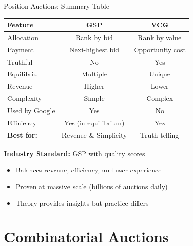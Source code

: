 \documentclass[xcolor={x11names}, aspectratio=169 ]{beamer}
\begin{document}
\begin{frame}{Position Auctions: Summary Table}
\begin{center}
\small
\begin{tabular}{lcc}
\toprule
\textbf{Feature} & \textbf{GSP} & \textbf{VCG} \\
\midrule
Allocation & Rank by bid & Rank by value \\
Payment & Next-highest bid & Opportunity cost \\
Truthful & No & Yes \\
Equilibria & Multiple & Unique \\
Revenue & Higher & Lower \\
Complexity & Simple & Complex \\
Used by Google & Yes & No \\
Efficiency & Yes (in equilibrium) & Yes \\
\midrule
\textbf{Best for:} & Revenue \& Simplicity & Truth-telling \\
\bottomrule
\end{tabular}
\end{center}

\textbf{Industry Standard:} GSP with quality scores
\begin{itemize}
  \item Balances revenue, efficiency, and user experience
  \item Proven at massive scale (billions of auctions daily)
  \item Theory provides insights but practice differs
\end{itemize}
\end{frame}

\section{Combinatorial Auctions}
\end{document}
